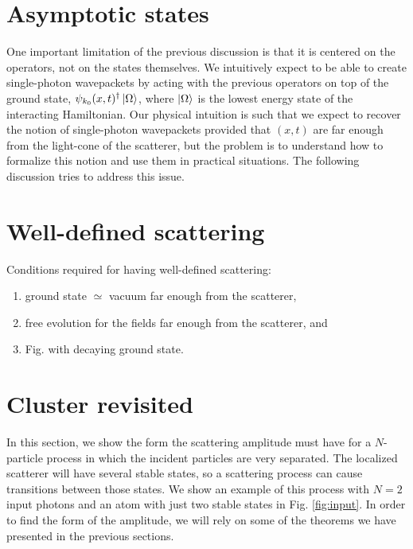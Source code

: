 \documentclass[notitlepage, prx, preprint, amsmath,superscriptaddress,amssymb]{revtex4-1}
\begin{document}
\section{Asymptotic states}

One important limitation of the previous discussion is that it is centered on the operators, not on the states themselves. We intuitively expect to be able to create single-photon wavepackets by acting with the previous operators on top of the ground state, $\psi_{k_0}(x,t)^\dagger\ket{\Omega}$, where $\ket{\Omega}$ is the lowest energy state of the interacting Hamiltonian. Our physical intuition is such that we expect to recover the notion of single-photon wavepackets provided that $(x,t)$ are far enough from the light-cone of the scatterer, but the problem is to understand how to formalize this notion and use them in practical situations. The following discussion tries to address this issue.


\section{Well-defined scattering}

{\color{blue}Conditions required for having well-defined scattering:

\begin{enumerate}
\item ground state $\simeq$ vacuum far enough from the scatterer,
\item free evolution for the fields far enough from the scatterer, and
\item Fig. with decaying ground state.
\end{enumerate}
}

\section{Cluster revisited}

In this section, we show the form the scattering amplitude must have for a $N$-particle process in which the incident particles are very separated. The localized scatterer will have several stable states, so a scattering process can cause transitions between those states. We show an example of this process with $N=2$ input photons and an atom with just two stable states in Fig. \ref{fig:input}. In order to find the form of the amplitude, we will rely on some of the theorems we have presented in the previous sections.
\end{document}
